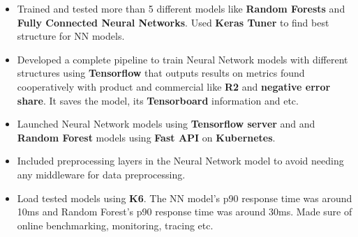 {\begin{itemize}[label=\textbullet]
            \item Trained and tested more than 5 different models like \textbf{Random Forests} and \textbf{Fully Connected Neural Networks}. Used \textbf{Keras Tuner} to find best structure for NN models.
            \item Developed a complete pipeline to train Neural Network models with different structures using \textbf{Tensorflow} that outputs results on metrics found cooperatively with product and commercial like \textbf{R2} and \textbf{negative error share}. It saves the model, its \textbf{Tensorboard} information and etc.
            \item Launched Neural Network models using \textbf{Tensorflow server} and and \textbf{Random Forest} models using \textbf{Fast API} on \textbf{Kubernetes}.
            \item Included preprocessing layers in the Neural Network model to avoid needing any middleware for data preprocessing.
            \item Load tested models using \textbf{K6}. The NN model's p90 response time was around 10ms and Random Forest's p90 response time was around 30ms. Made sure of online benchmarking, monitoring, tracing etc.
      \end{itemize}
}

\vspace{.5cm}


\vspace{.5cm}

